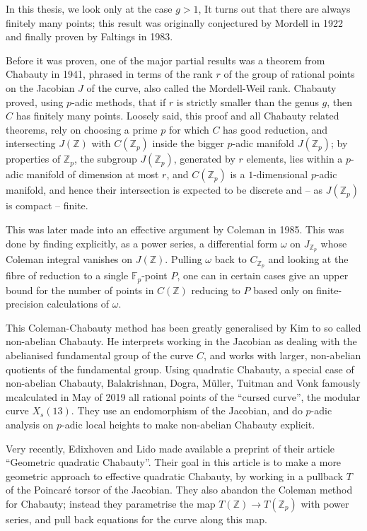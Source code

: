 \documentclass[12pt]{article}
\newcommand{\Z}{\mathbb{Z}}
\newcommand{\F}{\mathbb{F}}
\theoremstyle{plain}
\theoremstyle{definition}
\theoremstyle{remark}
\begin{document}
In this thesis, we look only at the case $g > 1$, It turns out that there are always finitely many points; this result was originally conjectured by Mordell in 1922 and finally proven by Faltings in 1983.

Before it was proven, one of the major partial results was a theorem from Chabauty in 1941, phrased in terms of the rank $r$ of the group of rational points on the Jacobian $J$ of the curve, also called the Mordell-Weil rank. Chabauty proved, using $p$-adic methods, that if $r$ is strictly smaller than the genus $g$, then $C$ has finitely many points. Loosely said, this proof and all Chabauty related theorems, rely on choosing a prime $p$ for which $C$ has good reduction, and intersecting $J(\Z)$ with $C(\Z_p)$ inside the bigger $p$-adic manifold $J(\Z_p)$; by properties of $\Z_p$, the subgroup $J(\Z_p)$, generated by $r$ elements, lies within a $p$-adic manifold of dimension at most $r$, and $C(\Z_p)$ is a $1$-dimensional $p$-adic manifold, and hence their intersection is expected to be discrete and -- as $J(\Z_p)$ is compact -- finite.

This was later made into an effective argument by Coleman in 1985. This was done by finding explicitly, as a power series, a differential form $\omega$ on $J_{\Z_p}$ whose Coleman integral vanishes on $J(\Z)$. Pulling $\omega$ back to $C_{\Z_p}$ and looking at the fibre of reduction to a single $\F_p$-point $P$, one can in certain cases give an upper bound for the number of points in $C(\Z)$ reducing to $P$ based only on finite-precision calculations of $\omega$.

This Coleman-Chabauty method has been greatly generalised by Kim to so called non-abelian Chabauty. He interprets working in the Jacobian as dealing with the abelianised fundamental group of the curve $C$, and works with larger, non-abelian quotients of the fundamental group. Using quadratic Chabauty, a special case of non-abelian Chabauty, Balakrishnan, Dogra, M\"uller, Tuitman and Vonk famously mcalculated in May of 2019 all rational points of the ``cursed curve'', the modular curve $X_s(13)$. They use an endomorphism of the Jacobian, and do $p$-adic analysis on $p$-adic local heights to make non-abelian Chabauty explicit. 

Very recently, Edixhoven and Lido made available a preprint of their article ``Geometric quadratic Chabauty''. Their goal in this article is to make a more geometric approach to effective quadratic Chabauty, by working in a pullback $T$ of the Poincar\'e torsor of the Jacobian. They also abandon the Coleman method for Chabauty; instead they parametrise the map $T(\Z) \to T(\Z_p)$ with power series, and pull back equations for the curve along this map. 
\end{document}
